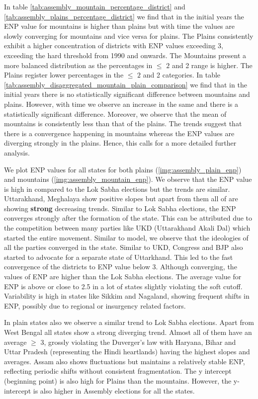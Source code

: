               
In table \ref{tab:assembly_mountain_percentage_district} and \ref{tab:assembly_plains_percentage_district} we find that in the initial years the ENP value for mountains is higher than plains but with time the values are slowly converging for mountains and vice versa for plains. The Plains consistently exhibit a higher concentration of districts with ENP values exceeding $3$, exceeding the hard threshold from 1990 and onwards.  The Mountains present a more balanced distribution as the percentages in $\leq$ $2$ and 2  range is higher.  The Plains  register lower percentages in the $\leq$ $2$ and 2  categories.   In table \ref{tab:assembly_disaggregated_mountain_plain_comparison} we find that in the initial years there is no statistically significant difference between mountains and plains. However, with time we observe an increase in the same and there is a statistically significant difference. Moreover, we observe that the mean of mountains is consistently less than that of the plains. The trends suggest that there is a convergence happening in mountains whereas the ENP values are diverging strongly in the plains. Hence, this calls for a more detailed further analysis.

 We plot ENP values for all states for both plains (\ref{img:assembly_plain_enp}) and mountains (\ref{img:assembly_mountain_enp}). We observe that the ENP value is high in compared to the Lok Sabha elections but the trends are similar. Uttarakhand, Meghalaya show positive slopes but apart from them all of are showing \textbf{strong} decreasing trends. Similar to Lok Sabha elections, the ENP converges strongly after the formation of the state. This can be attributed due to the competition between many parties like UKD (Uttarakhand Akali Dal) which started the entire movement. Similar to \cite{fey2007duverger} model, we observe that the ideologies of all the parties converged in the state. Similar to UKD, Congress and BJP also started to advocate for a separate state of Uttarkhand. This led to the fast convergence of the districts to ENP value below 3. Although converging, the values of ENP are higher than the Lok Sabha elections. The average value for ENP is above or close to 2.5 in a lot of states slightly violating the soft cutoff. Variability is high in states like Sikkim and Nagaland, showing frequent shifts in ENP, possibly due to regional or insurgency related factors. 
 
 In plain states also we observe a similar trend to Lok Sabha elections. Apart from West Bengal all states show a strong diverging trend. Almost all of them have an average $\geq$ 3, grossly violating the Duverger's law with Haryana, Bihar and Uttar Pradesh (representing the Hindi heartlands) having the highest slopes and averages.  Assam also shows fluctuations but maintains a relatively stable ENP, reflecting periodic shifts without consistent fragmentation. The y intercept (beginning point) is also high for Plains than the mountains. However, the y-intercept is also higher in Assembly elections for all the states. 


